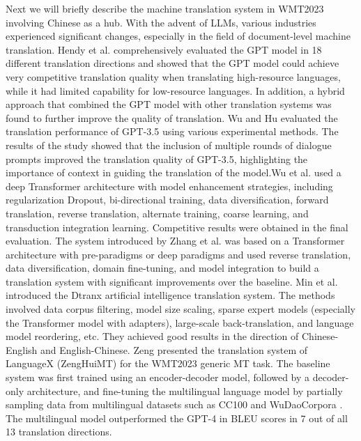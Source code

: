 \documentclass[acmsmall]{acmart}
\begin{document}
\color{red}
Next we will briefly describe the machine translation system in WMT2023 involving Chinese as a hub. With the advent of LLMs, various industries experienced significant changes, especially in the field of document-level machine translation. Hendy et al. \cite{hendy2023good} comprehensively evaluated the GPT model in 18 different translation directions and showed that the GPT model could achieve very competitive translation quality when translating high-resource languages, while it had limited capability for low-resource languages. In addition, a hybrid approach that combined the GPT model with other translation systems was found to further improve the quality of translation. Wu and Hu \cite{Wu2023ExploringPE} evaluated the translation performance of GPT-3.5 using various experimental methods. The results of the study showed that the inclusion of multiple rounds of dialogue prompts improved the translation quality of GPT-3.5, highlighting the importance of context in guiding the translation of the model.Wu et al. \cite{Wu2023TreatingGM} used a deep Transformer architecture with model enhancement strategies, including regularization Dropout, bi-directional training, data diversification, forward translation, reverse translation, alternate training, coarse learning, and transduction integration learning. Competitive results were obtained in the final evaluation. The system introduced by Zhang et al. \cite{Zhang2023IOLRM} was based on a Transformer architecture with pre-paradigms or deep paradigms and used reverse translation, data diversification, domain fine-tuning, and model integration to build a translation system with significant improvements over the baseline. Min et al. \cite{Min2023YishuYA} introduced the Dtranx artificial intelligence translation system. The methods involved data corpus filtering, model size scaling, sparse expert models (especially the Transformer model with adapters), large-scale back-translation, and language model reordering, etc. They achieved good results in the direction of Chinese-English and English-Chinese. Zeng \cite{Zeng2023AchievingSM} presented the translation system of LanguageX (ZengHuiMT) for the WMT2023 generic MT task. The baseline system was first trained using an encoder-decoder model, followed by a decoder-only architecture, and fine-tuning the multilingual language model by partially sampling data from multilingual datasets such as CC100 \cite{conneau2019unsupervised} and WuDaoCorpora \cite{yuan2021wudaocorpora}. The multilingual model outperformed the GPT-4 in BLEU scores in 7 out of all 13 translation directions.
\end{document}
